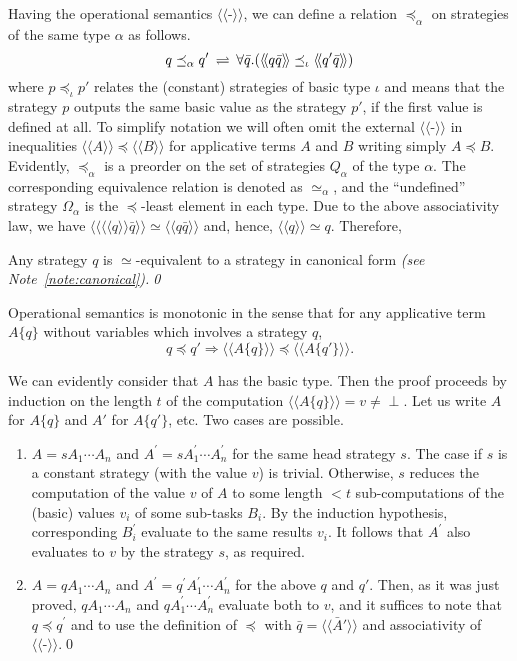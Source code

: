 \documentclass[fleqn]{LMCS}
\theoremstyle{plain}\newtheorem{satz}[thm]{Satz}
\theoremstyle{plain}\newtheorem{hyp}[thm]{Hypothesis}
\theoremstyle{plain}\newtheorem{hyps}[thm]{Hypotheses}
\theoremstyle{definition}\newtheorem{note}[thm]{Note}
\newcommand{\setof}[1]{\{#1\}}
\newcommand{\bYdef}{\mathrel{\BYDEF}}
\newcommand{\BYDEF}{\mbox{$\hspace{.2em}\rightleftharpoons\hspace{.2em}$}}
\newcommand{\pr}{^{\prime}}
\newcommand{\Arr}{\Rightarrow}
\newcommand{\lla}{\langle\!\langle}
\newcommand{\rra}{\rangle\!\rangle}
\newcommand{\Osem}[1]{\lla #1 \rra}
\newcommand{\Undef}{{\perp}}
\newcommand{\lee}{\preceq}
\newcommand{\?}{\mbox{?}}
\begin{document}
\noindent
Having the operational semantics $\Osem{\mbox{-}}$, we can define a
relation $\lee_\alpha$ on strategies of the same type $\alpha$ as follows.
\begin{equation}\label{eq:approx-strat}
q\lee_\alpha q\pr \bYdef
\forall \bar{q}.(\Osem{q\bar{q}}\lee_\iota \Osem{q\pr\bar{q}})
\end{equation}
where $p\lee_\iota p'$ relates the (constant) strategies of 
basic type $\iota$ and 
means that the strategy $p$ outputs 
the same basic value as the strategy $p'$, if the first value is
defined at all. 
	To simplify notation we will often omit the external $\Osem{\mbox{-}}$
	in inequalities $\Osem{A}\lee\Osem{B}$ for applicative terms
	$A$ and $B$ writing simply $A\lee B$.
Evidently, $\lee_\alpha$ is a preorder on the set of strategies 
$Q_\alpha$ of the type $\alpha$. The corresponding
equivalence relation is denoted as $\simeq_\alpha$, and the ``undefined'' strategy 
$\Omega_\alpha$ is the
$\lee$-least element in each type. 
Due to the above associativity law, we
have $\Osem{\Osem{q}\bar{q}}\simeq\Osem{q\bar{q}}$ and, hence, 
$\Osem{q}\simeq q$. Therefore, 
\begin{prop}
Any strategy $q$ is $\simeq$-equivalent to a
strategy in canonical form
\em (see Note~\ref{note:canonical}).\qed
\end{prop}
\begin{lem}\label{lemma:monotonic-op-sem}
Operational semantics is monotonic in the sense that 
for any applicative term $A\setof{q}$ without variables 
which involves a strategy $q$, 
\[
q\lee q'\Arr
\Osem{A\setof{q}}\lee\Osem{A\setof{q'}}. 
\]
\end{lem}
\proof  We can evidently consider that $A$ has the basic type. 
Then the proof proceeds by induction on the length $t$ of the computation 
$\Osem{A\setof{q}}=v\ne\Undef$. 
Let us write $A$ for $A\setof{q}$ and $A'$ for $A\setof{q'}$, etc. 
Two cases are possible. 
\begin{enumerate}[(1)]
\item 
$A=sA_1\cdots A_n$ and 
$A\pr=sA\pr_1\cdots A\pr_n$ for the same head strategy $s$. 
The case if $s$ is a constant strategy (with the value $v$) is trivial. 
Otherwise, $s$ reduces
the computation of the value $v$ of $A$ to some length ${}< t$ sub-computations of the
(basic) values $v_i$ of some sub-tasks $B_i$. By the induction hypothesis, 
corresponding $B\pr_i$ evaluate to
the same results $v_i$. It follows that $A\pr$ also evaluates 
to $v$ by the strategy $s$, as required.
\item 
$A=qA_1\cdots A_n$ and $A\pr=q\pr A\pr_1\cdots A\pr_n$ 
for the above $q$ and $q'$. 
Then, as
it was just proved,
$q A_1\cdots A_n$ and $q A\pr_1\cdots A\pr_n$ evaluate both to $v$, 
and it suffices to note that $q\lee q\pr$ and to use the 
definition of $\lee$ with $\bar{q}=\Osem{\bar{A}'}$ and associativity 
of~$\Osem{\mbox{-}}$.\qed
\end{enumerate}
\end{document}
